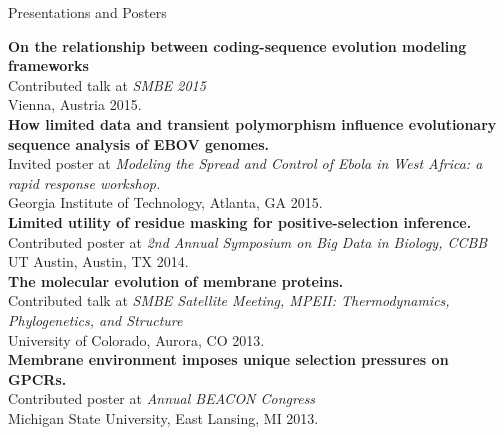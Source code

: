 \documentclass{resume} %
\begin{document}
\vspace*{0.5cm}
\begin{rSection}{Presentations and Posters}
\vspace*{0.25cm}

\textbf{On the relationship between coding-sequence evolution modeling frameworks}
\\Contributed talk at \emph{SMBE 2015}
\\ Vienna, Austria 2015.\\


\textbf{How limited data and transient polymorphism influence evolutionary sequence analysis of EBOV genomes.}
\\Invited poster at \emph{Modeling the Spread and Control of Ebola in West Africa: a rapid response workshop.}
\\ Georgia Institute of Technology, Atlanta, GA 2015.\\

\textbf{Limited utility of residue masking for positive-selection inference.}
\\Contributed poster at \emph{2nd Annual Symposium on Big Data in Biology, CCBB}
\\ UT Austin, Austin, TX 2014.\\

\textbf{The molecular evolution of membrane proteins.}
\\Contributed talk at \emph{SMBE Satellite Meeting, MPEII: Thermodynamics, Phylogenetics, and Structure}
\\ University of Colorado, Aurora, CO 2013.\\

\textbf{Membrane environment imposes unique selection pressures on GPCRs.}
\\Contributed poster at \emph{Annual BEACON Congress}
\\ Michigan State University, East Lansing, MI 2013.


\end{rSection}








\end{document}
